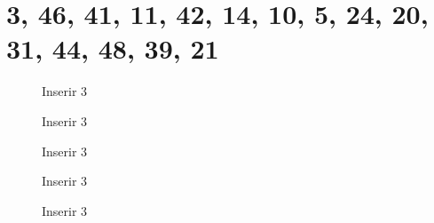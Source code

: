 \section{3, 46, 41, 11, 42, 14, 10, 5, 24, 20, 31, 44, 48, 39, 21}

\begin{frame}
\begin{figure}[!h]
  \centering
  \caption{Inserir 3}


\end{figure}

\end{frame}
\begin{frame}
  \begin{figure}[!h]
    \centering
    \caption{Inserir 3}
  
  
  \end{figure}
  
  \end{frame}

  \begin{frame}
    \begin{figure}[!h]
      \centering
      \caption{Inserir 3}
    
    
    \end{figure}
    
    \end{frame}

    \begin{frame}
      \begin{figure}[!h]
        \centering
        \caption{Inserir 3}
      
      
      \end{figure}
      
      \end{frame}

      \begin{frame}
        \begin{figure}[!h]
          \centering
          \caption{Inserir 3}
        
        
        \end{figure}
        
        \end{frame}
        